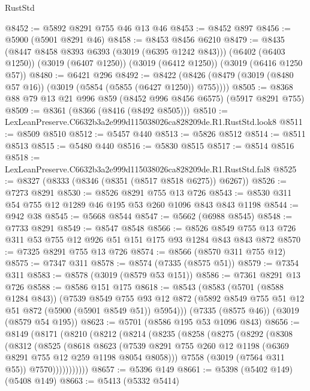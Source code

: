 \begin{lexlean}{RustStd}
\begin{coremodule}
@8452 := @5892 @8291 @755 @46 @13 @46
@8453 := @8452 @897
@8456 := @5900 (@5901 @8291 @46)
@8458 := @8453 @8456 @6210
@8479 := @8435
    (@8447 @8458 @8393 @6393 (@3019 (@6395 @1242 @843)))
    (@6402 (@6403 @1250))
    (@3019 (@6407 @1250))
    (@3019 (@6412 @1250))
    (@3019 (@6416 @1250 @57))
@8480 := @6421 @296
@8492 := @8422 (@8426 (@8479 (@3019 (@8480 @57 @16)) (@3019 (@5854 (@5855 (@6427 @1250)) @755))))
@8505 := @8368 @88 @79 @13 @21 @996 @859 (@8452 @996 @8456 @6575) (@5917 @8291 @755)
@8509 := @8361 (@8366 (@8416 (@8492 @8505)))
@8510 := LexLeanPreserve.C6632b3a2e999d115038026ca828209de.R1.RustStd.look8
@8511 := @8509 @8510
@8512 := @5457 @440
@8513 := @5826 @8512
@8514 := @8511 @8513
@8515 := @5480 @440
@8516 := @5830 @8515
@8517 := @8514 @8516
@8518 := LexLeanPreserve.C6632b3a2e999d115038026ca828209de.R1.RustStd.fal8
@8525 := @8327 (@8333 (@8346 (@8351 (@8517 @8518 @6275)) @6267))
@8526 := @7273 @8291
@8530 := @8526 @8291 @755 @13 @726
@8543 := @8530 @311 @54 @755 @12 @1289 @46 @195 @53 @260 @1096 @843 @843 @1198
@8544 := @942 @38
@8545 := @5668 @8544
@8547 := @5662 (@6988 @8545)
@8548 := @7733 @8291
@8549 := @8547 @8548
@8566 := @8526 @8549 @755 @13 @726 @311 @53 @755 @12 @926 @51 @151 @175 @93 @1284 @843 @843 @872
@8570 := @7325 @8291 @755 @13 @726
@8574 := @8566 (@8570 @311 @755 @12)
@8575 := @7347 @311
@8578 := @8574 (@7335 (@8575 @51))
@8579 := @7354 @311
@8583 := @8578 (@3019 (@8579 @53 @151))
@8586 := @7361 @8291 @13 @726
@8588 := @8586 @151 @175
@8618 := @8543
    (@8583
      (@5701 (@8588 @1284 @843))
      (@7539
        @8549
        @755
        @93
        @12
        @872
        (@5892 @8549 @755 @51 @12 @51 @872 (@5900 (@5901 @8549 @51)) @5954)))
    (@7335 (@8575 @46))
    (@3019 (@8579 @54 @195))
@8623 := @5701 (@8586 @195 @53 @1096 @843)
@8656 := @8149
    (@8171
      (@8210
        (@8212
          (@8214
            (@8235
              (@8258
                (@8275
                  (@8292
                    (@8308
                      (@8312
                        (@8525
                          (@8618
                            @8623
                            (@7539
                              @8291
                              @755
                              @260
                              @12
                              @1198
                              (@6369 @8291 @755 @12 @259 @1198 @8054 @8058)))
                          @7558
                          (@3019 (@7564 @311 @55))
                          @7570)))))))))))
@8657 := @5396 @149
@8661 := @5398 (@5402 @149) (@5408 @149)
@8663 := @5413 (@5332 @5414)

\end{coremodule}
\end{lexlean}
